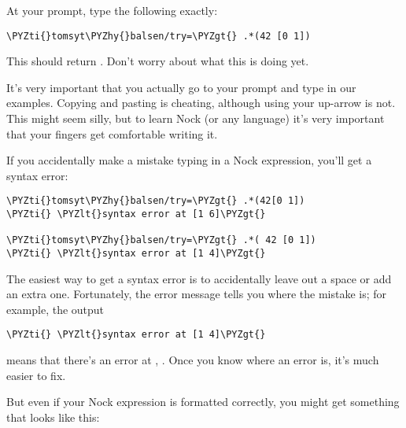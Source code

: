 At your prompt, type the following exactly:
\begin{framed_shaded}
\begin{Verbatim}[fontsize=\relsize{-2.5},commandchars=\\\{\}]
\PYZti{}tomsyt\PYZhy{}balsen/try=\PYZgt{} .*(42 [0 1])
\end{Verbatim}
\end{framed_shaded}
This should return . Don't worry about what this is doing yet.

It's very important that you actually go to your prompt and type in our
examples. Copying and pasting is cheating, although using your up-arrow is not. This might seem silly, but to learn
Nock (or any language)  it's very important that your fingers get
comfortable writing it. 

If you accidentally make a mistake typing in a Nock expression, you'll get a
syntax error:

\begin{framed_shaded}
\begin{Verbatim}[fontsize=\relsize{-2.5},commandchars=\\\{\}]
\PYZti{}tomsyt\PYZhy{}balsen/try=\PYZgt{} .*(42[0 1])
\PYZti{} \PYZlt{}syntax error at [1 6]\PYZgt{}

\PYZti{}tomsyt\PYZhy{}balsen/try=\PYZgt{} .*( 42 [0 1])
\PYZti{} \PYZlt{}syntax error at [1 4]\PYZgt{}
\end{Verbatim}
\end{framed_shaded}

The easiest way to get a syntax error is to accidentally leave out a space or add
an extra one. Fortunately, the error message tells you where the mistake is; for example, the output

\begin{framed_shaded}
\begin{Verbatim}[fontsize=\relsize{-2.5},commandchars=\\\{\}]
\PYZti{} \PYZlt{}syntax error at [1 4]\PYZgt{}
\end{Verbatim}
\end{framed_shaded}
means that there's an error at , .  Once you know where an
error is, it's much easier to fix.

But even if your Nock expression is formatted correctly, you might get
something that looks like this:

